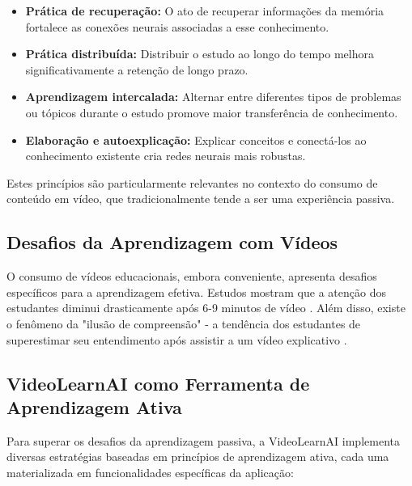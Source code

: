 \documentclass[tcc,capa]{texufpel}
\begin{document}
\begin{itemize}
    \item \textbf{Prática de recuperação:} O ato de recuperar informações da memória fortalece as conexões neurais associadas a esse conhecimento.
    
    \item \textbf{Prática distribuída:} Distribuir o estudo ao longo do tempo melhora significativamente a retenção de longo prazo.
    
    \item \textbf{Aprendizagem intercalada:} Alternar entre diferentes tipos de problemas ou tópicos durante o estudo promove maior transferência de conhecimento.
    
    \item \textbf{Elaboração e autoexplicação:} Explicar conceitos e conectá-los ao conhecimento existente cria redes neurais mais robustas.
\end{itemize}

Estes princípios são particularmente relevantes no contexto do consumo de conteúdo em vídeo, que tradicionalmente tende a ser uma experiência passiva.

\subsection{Desafios da Aprendizagem com Vídeos}

O consumo de vídeos educacionais, embora conveniente, apresenta desafios específicos para a aprendizagem efetiva. Estudos mostram que a atenção dos estudantes diminui drasticamente após 6-9 minutos de vídeo \cite{guo2014video}. Além disso, existe o fenômeno da "ilusão de compreensão" - a tendência dos estudantes de superestimar seu entendimento após assistir a um vídeo explicativo \cite{schwan2004learning}.

\subsection{VideoLearnAI como Ferramenta de Aprendizagem Ativa}

Para superar os desafios da aprendizagem passiva, a VideoLearnAI implementa diversas estratégias baseadas em princípios de aprendizagem ativa, cada uma materializada em funcionalidades específicas da aplicação:
\end{document}
